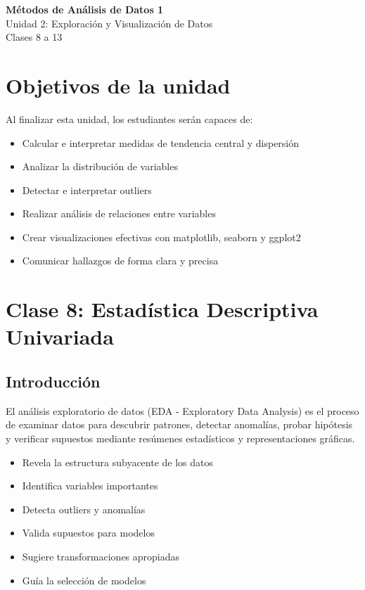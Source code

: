 \documentclass[a4paper,11pt]{article}
\begin{document}
\begin{center}
    {\Large \textbf{Métodos de Análisis de Datos 1}}\\[0.3em]
    {\large Unidad 2: Exploración y Visualización de Datos}\\[0.2em]
    {\normalsize Clases 8 a 13}
\end{center}

\vspace{1em}

\section*{Objetivos de la unidad}

Al finalizar esta unidad, los estudiantes serán capaces de:
\begin{itemize}[leftmargin=*]
    \item Calcular e interpretar medidas de tendencia central y dispersión
    \item Analizar la distribución de variables
    \item Detectar e interpretar outliers
    \item Realizar análisis de relaciones entre variables
    \item Crear visualizaciones efectivas con matplotlib, seaborn y ggplot2
    \item Comunicar hallazgos de forma clara y precisa
\end{itemize}

\section{Clase 8: Estadística Descriptiva Univariada}

\subsection{Introducción}

El análisis exploratorio de datos (EDA - Exploratory Data Analysis) es el proceso de examinar datos para descubrir patrones, detectar anomalías, probar hipótesis y verificar supuestos mediante resúmenes estadísticos y representaciones gráficas.

\begin{tcolorbox}[colback=ejemplocolor!20, colframe=unidadcolor, title=¿Por qué es importante el EDA?]
\begin{itemize}
    \item Revela la estructura subyacente de los datos
    \item Identifica variables importantes
    \item Detecta outliers y anomalías
    \item Valida supuestos para modelos
    \item Sugiere transformaciones apropiadas
    \item Guía la selección de modelos
\end{itemize}
\end{tcolorbox}
\end{document}
